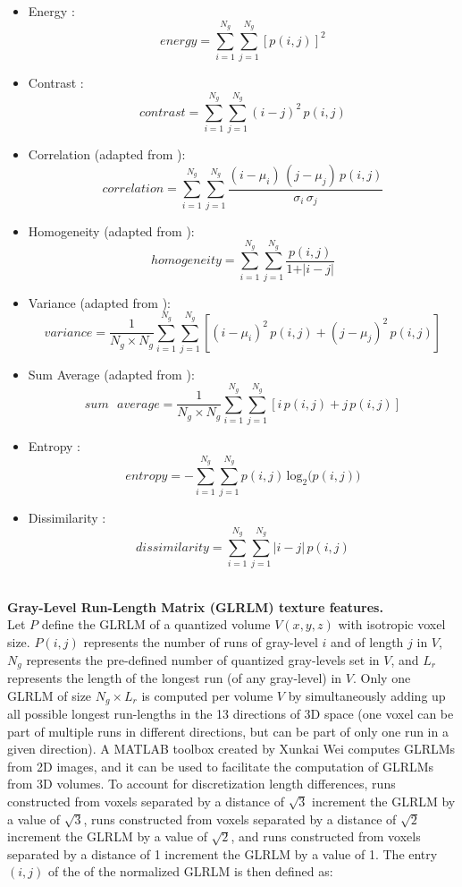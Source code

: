 \documentclass{article}
\begin{document}
\begin{itemize}
	\item Energy \cite{HaralickRM1973}:
		  \[energy = \sum_{i=1}^{N_g}\sum_{j=1}^{N_g} \left[p(i,j)\right]^2\]
	\item Contrast \cite{HaralickRM1973}:
		  \[contrast = \sum_{i=1}^{N_g}\sum_{j=1}^{N_g} (i-j)^2\,p(i,j)\]
	\item Correlation (adapted from \cite{HaralickRM1973}):
		  \[correlation = \sum_{i=1}^{N_g}\sum_{j=1}^{N_g} \frac{(i-\mu_i)\,(j-\mu_j)\,p(i,j)}	
		  {\sigma_i\,\sigma_j}\]
	\item Homogeneity (adapted from \cite{HaralickRM1973}):
		  \[homogeneity = \sum_{i=1}^{N_g}\sum_{j=1}^{N_g} \frac{p(i,j)}{1 + \vert i-j \vert}\]
	\item Variance (adapted from \cite{HaralickRM1973}):
		  \[variance = \frac{1}{N_g \times N_g} \sum_{i=1}^{N_g}\sum_{j=1}^{N_g} 
		  \left[(i-\mu_i)^2\,p(i,j) + (j-\mu_j)^2\,p(i,j)\right]\]
	\item Sum Average (adapted from \cite{HaralickRM1973}):
		  \[sum\text{ }average = \frac{1}{N_g \times N_g} \sum_{i=1}^{N_g}\sum_{j=1}^{N_g} 
		  \left[i\,p(i,j) + j\,p(i,j)\right]\]
	\item Entropy \cite{HaralickRM1973}:
		  \[entropy = -\sum_{i=1}^{N_g}\sum_{j=1}^{N_g} p(i,j)\,\text{log}_2\big(p(i,j)\big)\]
	\item Dissimilarity \cite{ThibaultG2009t}:
		  \[dissimilarity = \sum_{i=1}^{N_g}\sum_{j=1}^{N_g} \vert i-j \vert \,p(i,j)\]
	\\	
\end{itemize}


\noindent \textbf{Gray-Level Run-Length Matrix (GLRLM) texture features.} \\
Let $P$ define the GLRLM of a quantized volume $V(x,y,z)$ with isotropic voxel size. $P(i,j)$ represents the number of runs of gray-level $i$ and of length $j$ in $V$, $N_g$ represents the pre-defined number of quantized gray-levels set in $V$, and $L_r$ represents the length of the longest run (of any gray-level) in $V$. Only one GLRLM of size $N_g \times L_r$ is computed per volume $V$ by simultaneously adding up all possible longest run-lengths in the 13 directions of 3D space (one voxel can be part of multiple runs in different directions, but can be part of only one run in a given direction). A MATLAB toolbox created by Xunkai Wei \cite{WeiX2008} computes GLRLMs from 2D images, and it can be used to facilitate the computation of GLRLMs from 3D volumes. To account for discretization length differences, runs constructed from voxels separated by a distance of $\sqrt{3}$ increment the GLRLM by a value of $\sqrt{3}$, runs constructed from voxels separated by a distance of $\sqrt{2}$ increment the GLRLM by a value of $\sqrt{2}$, and runs constructed from voxels separated by a distance of 1 increment the GLRLM by a value of 1. The entry $(i,j)$ of the of the normalized GLRLM is then defined as:
\end{document}
